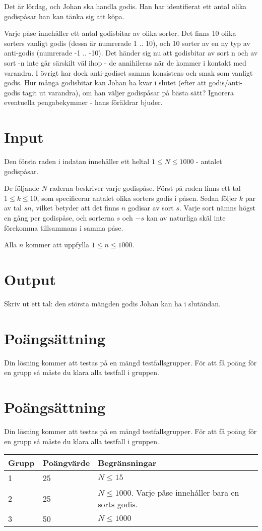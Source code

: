 
Det är lördag, och Johan ska handla godis. Han har identifierat ett antal olika godispåsar han kan tänka sig att köpa.

Varje påse innehåller ett antal godisbitar av olika sorter. Det finns 10 olika sorters vanligt godis (dessa är numrerade 1 .. 10), och 10 sorter av en ny typ av anti-godis (numrerade -1 .. -10). Det händer sig nu att godisbitar av sort n och av sort -n inte går särskilt väl ihop - de annihileras när de kommer i kontakt med varandra. I övrigt har dock anti-godiset samma konsistens och smak som vanligt godis. Hur många godisbitar kan Johan ha kvar i slutet (efter att godis/anti-godis tagit ut varandra), om han väljer godispåsar på bästa sätt? Ignorera eventuella pengabekymmer - hans föräldrar bjuder.

\section*{Input}

Den första raden i indatan innehåller ett heltal $1 \le N \le 1000$ - antalet godispåsar.

De följande $N$ raderna beskriver varje godispåse.
Först på raden finns ett tal $1 \le k \le 10$, som specificerar antalet olika sorters godis i påsen.
Sedan följer $k$ par av tal $s n$, vilket betyder att det finns $n$ godisar av sort $s$.
Varje sort nämns högst en gång per godispåse, och sorterna $s$ och $-s$ kan av naturliga skäl inte förekomma tillsammans i samma påse.

Alla $n$ kommer att uppfylla $1 \le n \le 1000$.

\section*{Output}

Skriv ut ett tal: den största mängden godis Johan kan ha i slutändan.

\section*{Poängsättning}
Din lösning kommer att testas på en mängd testfallsgrupper. För att få poäng för en grupp så måste du klara alla testfall i gruppen.


\section*{Poängsättning}
Din lösning kommer att testas på en mängd testfallsgrupper. För att få poäng för en grupp så måste du klara alla testfall i gruppen.

\begin{tabular}{| l | l | l |}
	\hline
	Grupp & Poängvärde & Begränsningar\\ \hline
  1     & 25         & $N \le 15$ \\ \hline
  2     & 25         & $N \le 1000$. Varje påse innehåller bara en sorts godis. \\ \hline
  3     & 50         & $N \le 1000$ \\ \hline
\end{tabular}
